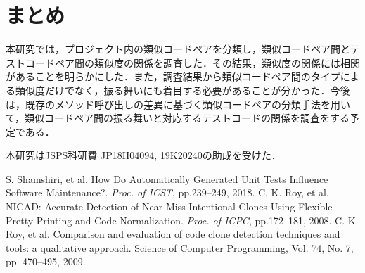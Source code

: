 \documentclass{fose2019}           %
\begin{document}
\section{まとめ}
本研究では，プロジェクト内の類似コードペアを分類し，類似コードペア間とテストコードペア間の類似度の関係を調査した．その結果，類似度の関係には相関があることを明らかにした．また，調査結果から類似コードペア間のタイプによる類似度だけでなく，振る舞いにも着目する必要があることが分かった．今後は，既存のメソッド呼び出しの差異に基づく類似コードペアの分類手法を用いて，類似コードペア間の振る舞いと対応するテストコードの関係を調査をする予定である．
%

\acknowledgements{}
本研究はJSPS科研費 JP18H04094, 19K20240の助成を受けた．


\begin{thebibliography}{2}
 S. Shamshiri, et al. How Do Automatically Generated Unit Tests Influence Software Maintenance?. {\it Proc. of ICST}, pp.239--249, 2018. 
 C. K. Roy, et al. NICAD: Accurate Detection of Near-Miss Intentional Clones Using Flexible Pretty-Printing and Code Normalization. {\it Proc. of ICPC}, pp.172--181, 2008.
 C. K. Roy, et al. Comparison and evaluation of code clone detection techniques and tools: a qualitative approach. Science of Computer Programming, Vol. 74, No. 7, pp. 470–495, 2009.
\end{thebibliography}
\end{document}
